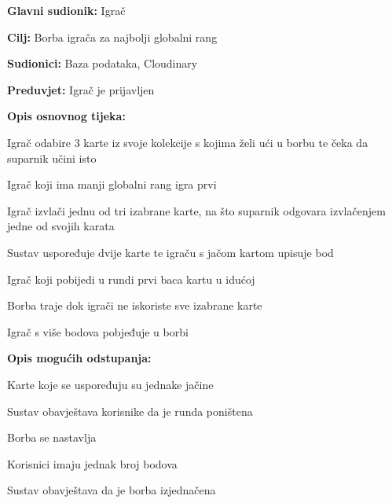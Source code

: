 					\noindent {}
					\begin{packed_item}
						
						\item \textbf{Glavni sudionik: }Igrač
						\item  \textbf{Cilj:} Borba igrača za najbolji globalni rang
						\item  \textbf{Sudionici:} Baza podataka, Cloudinary
						\item  \textbf{Preduvjet:} Igrač je prijavljen
						\item  \textbf{Opis osnovnog tijeka:}
						
						\item[] \begin{packed_enum}
							
							\item Igrač odabire 3 karte iz svoje kolekcije s kojima želi ući u borbu te čeka da suparnik učini isto 
							\item Igrač koji ima manji globalni rang igra prvi 
							\item Igrač izvlači jednu od tri izabrane karte, na što suparnik odgovara izvlačenjem jedne od svojih karata
							\item Sustav uspoređuje dvije karte te igraču s jačom kartom upisuje bod
							\item Igrač koji pobijedi u rundi prvi baca kartu u idućoj
							\item Borba traje dok igrači ne iskoriste sve izabrane karte
							\item Igrač s više bodova pobjeđuje u borbi
							
						\end{packed_enum}
					
					\item  \textbf{Opis mogućih odstupanja:}
					
					\item[] \begin{packed_item}
						
						\item Karte koje se uspoređuju su jednake jačine
						\item[] \begin{packed_enum}
							
							\item Sustav obavještava korisnike da je runda poništena
							\item Borba se nastavlja
							
						\end{packed_enum}
					
						\item Korisnici imaju jednak broj bodova
						\item[] \begin{packed_enum}
							
							\item Sustav obavještava da je borba izjednačena
							
						\end{packed_enum}
					\end{packed_item}
					\end{packed_item}
				

